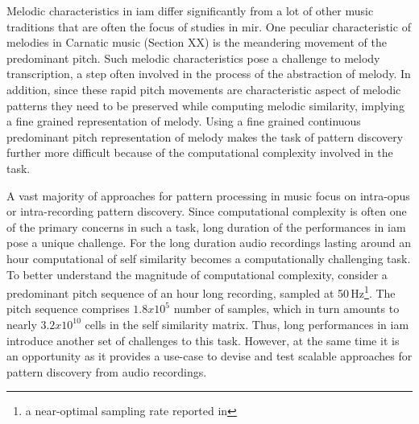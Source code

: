 Melodic characteristics in \gls{iam} differ significantly from a lot of other music traditions that are often the focus of studies in \gls{mir}. One peculiar characteristic of  melodies in Carnatic music (Section XX) is the meandering movement of the predominant pitch. Such melodic characteristics pose a challenge to melody transcription, a step often involved in the process of the abstraction of melody. In addition, since these rapid pitch movements are characteristic aspect of melodic patterns they need to be preserved while computing melodic similarity, implying a fine grained representation of melody. Using a fine grained continuous predominant pitch representation of melody makes the task of pattern discovery further more difficult because of the computational complexity involved in the task.



A vast majority of approaches for pattern processing in music focus on intra-opus or intra-recording pattern discovery. Since computational complexity is often one of the primary concerns in such a task, long duration of the performances in \gls{iam} pose a unique challenge. For the long duration audio recordings lasting around an hour computational of self similarity becomes a computationally challenging task. To better understand the magnitude of computational complexity, consider a predominant pitch sequence of an hour long recording, sampled at 50\,Hz\footnote{a near-optimal sampling rate reported in }. The pitch sequence comprises $1.8x10^{5}$ number of samples, which in turn amounts to nearly $3.2x10^{10}$ cells in the self similarity matrix.  Thus, long performances in \gls{iam} introduce another set of challenges to this task. However, at the same time it is an opportunity as it provides a use-case to devise and test scalable approaches for pattern discovery from audio recordings. 



